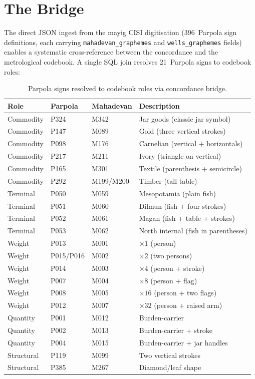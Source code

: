 \label{sec:prediction}

\section{The Bridge}

The direct JSON ingest from the mayig CISI digitisation
(396~Parpola sign definitions, each carrying
\texttt{mahadevan\_graphemes} and \texttt{wells\_graphemes} fields)
enables a systematic cross-reference between the concordance and
the metrological codebook.
A single SQL join resolves 21~Parpola signs to codebook roles:

\begin{longtable}{@{}llll@{}}
\caption{Parpola signs resolved to codebook roles via concordance bridge.}
\label{tab:bridge}\\
\toprule
Role & Parpola & Mahadevan & Description \\
\midrule
\endfirsthead
\bottomrule
\endlastfoot
Commodity & P324 & M342 & Jar goods (classic jar symbol) \\
\midrule
Commodity & P147 & M089 & Gold (three vertical strokes) \\
\midrule
Commodity & P098 & M176 & Carnelian (vertical + horizontals) \\
\midrule
Commodity & P217 & M211 & Ivory (triangle on vertical) \\
\midrule
Commodity & P165 & M301 & Textile (parenthesis + semicircle) \\
\midrule
Commodity & P292 & M199/M200 & Timber (tall table) \\
\midrule
Terminal & P050 & M059 & Mesopotamia (plain fish) \\
\midrule
Terminal & P051 & M060 & Dilmun (fish + four strokes) \\
\midrule
Terminal & P052 & M061 & Magan (fish + table + strokes) \\
\midrule
Terminal & P053 & M062 & North internal (fish in parentheses) \\
\midrule
Weight & P013 & M001 & $\times 1$ (person) \\
\midrule
Weight & P015/P016 & M002 & $\times 2$ (two persons) \\
\midrule
Weight & P014 & M003 & $\times 4$ (person + stroke) \\
\midrule
Weight & P007 & M004 & $\times 8$ (person + flag) \\
\midrule
Weight & P008 & M005 & $\times 16$ (person + two flags) \\
\midrule
Weight & P012 & M007 & $\times 32$ (person + raised arm) \\
\midrule
Quantity & P001 & M012 & Burden-carrier \\
\midrule
Quantity & P002 & M013 & Burden-carrier + stroke \\
\midrule
Quantity & P004 & M015 & Burden-carrier + jar handles \\
\midrule
Structural & P119 & M099 & Two vertical strokes \\
\midrule
Structural & P385 & M267 & Diamond/leaf shape \\
\end{longtable}

